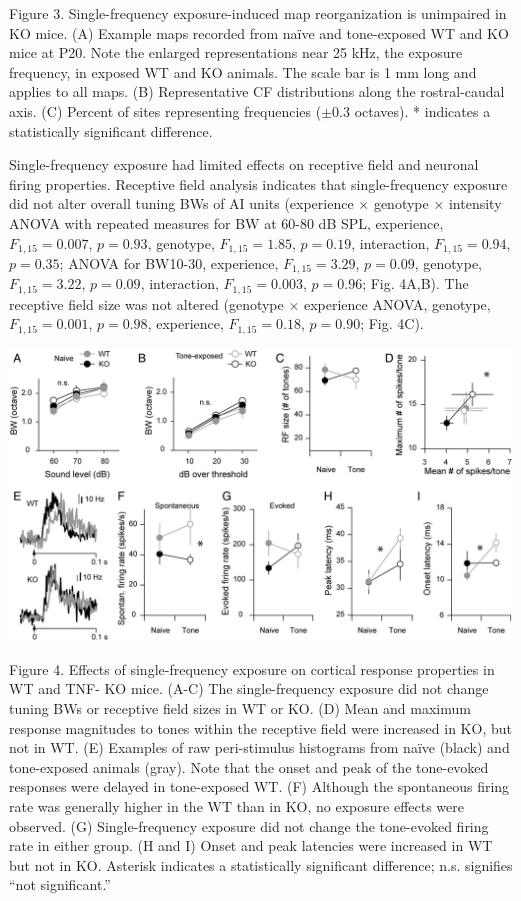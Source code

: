 \begin{changemargin}{1in}{1in}
\footnotesize{Figure 3. Single-frequency exposure-induced map reorganization is unimpaired in KO mice. (A) Example maps recorded from na\"ive and tone-exposed WT and KO mice at P20. Note the enlarged representations near 25 kHz, the exposure frequency, in exposed WT and KO animals. The scale bar is 1 mm long and applies to all maps. (B) Representative CF distributions along the rostral-caudal axis. (C) Percent of sites representing frequencies ($\pm0.3$ octaves). * indicates a statistically significant difference.}
\end{changemargin}

Single-frequency exposure had limited effects on receptive field and neuronal firing properties. Receptive field analysis indicates that single-frequency exposure did not alter overall tuning BWs of AI units (experience $\times$ genotype $\times$ intensity ANOVA with repeated measures for BW at 60-80 dB SPL, experience, $F_{1,15}=0.007$, $p=0.93$, genotype, $F_{1,15}=1.85$, $p=0.19$, interaction, $F_{1,15}=0.94$, $p=0.35$; ANOVA for BW10-30, experience, $F_{1,15}=3.29$, $p=0.09$, genotype, $F_{1,15}=3.22$, $p=0.09$, interaction, $F_{1,15}=0.003$, $p=0.96$; Fig. 4A,B). The receptive field size was not altered (genotype $\times$ experience ANOVA, genotype, $F_{1,15}=0.001$, $p=0.98$, experience, $F_{1,15}=0.18$, $p=0.90$; Fig. 4C).

\centerline{\includegraphics{images/C3F4}}

\begin{changemargin}{1in}{1in}
\footnotesize{Figure 4. Effects of single-frequency exposure on cortical response properties in WT and TNF-\textalpha{} KO mice. (A-C) The single-frequency exposure did not change tuning BWs or receptive field sizes in WT or KO. (D) Mean and maximum response magnitudes to tones within the receptive field were increased in KO, but not in WT. (E) Examples of raw peri-stimulus histograms from na\"ive (black) and tone-exposed animals (gray). Note that the onset and peak of the tone-evoked responses were delayed in tone-exposed WT. (F) Although the spontaneous firing rate was generally higher in the WT than in KO, no exposure effects were observed. (G) Single-frequency exposure did not change the tone-evoked firing rate in either group. (H and I) Onset and peak latencies were increased in WT but not in KO. Asterisk indicates a statistically significant difference; n.s. signifies “not significant.”}
\end{changemargin}

